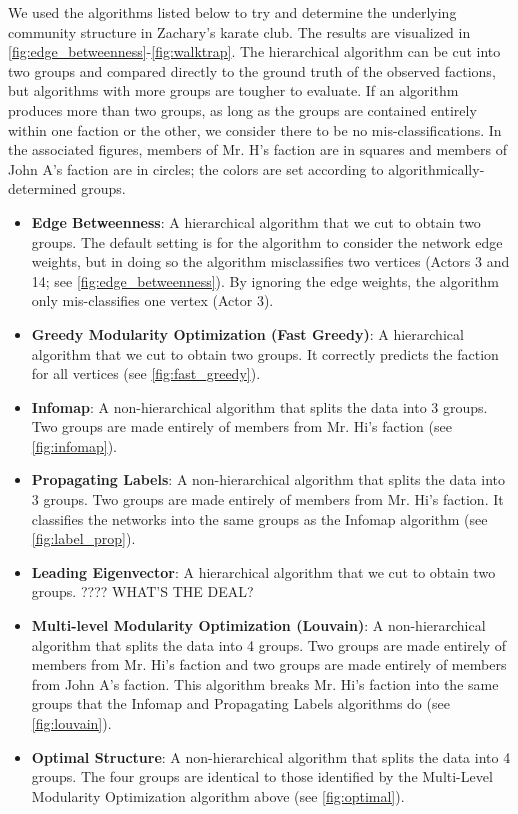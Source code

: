 We used the algorithms listed below to try and determine the underlying community structure in Zachary's karate club. The results are visualized in \cref{fig:edge_betweenness}-\cref{fig:walktrap}. The hierarchical algorithm can be cut into two groups and compared directly to the ground truth of the observed factions, but algorithms with more groups are tougher to evaluate. If an algorithm produces more than two groups, as long as the groups are contained entirely within one faction or the other, we consider there to be no mis-classifications. In the associated figures, members of Mr. H's faction are in squares and members of John A's faction are in circles; the colors are set according to algorithmically-determined groups.
\begin{itemize}
\item \textbf{Edge Betweenness}: A hierarchical algorithm that we cut to obtain two groups. The default setting is for the algorithm to consider the network edge weights, but in doing so the algorithm misclassifies two vertices (Actors 3 and 14; see \cref{fig:edge_betweenness}). By ignoring the edge weights, the algorithm only mis-classifies one vertex (Actor 3). 
\item \textbf{Greedy Modularity Optimization (Fast Greedy)}: A hierarchical algorithm that we cut to obtain two groups. It correctly predicts the faction for all vertices (see \cref{fig:fast_greedy}).
\item \textbf{Infomap}: A non-hierarchical algorithm that splits the data into 3 groups. Two groups are made entirely of members from Mr. Hi's faction (see \cref{fig:infomap}).
\item \textbf{Propagating Labels}: A non-hierarchical algorithm that splits the data into 3 groups. Two groups are made entirely of members from Mr. Hi's faction. It classifies the networks into the same groups as the Infomap algorithm (see \cref{fig:label_prop}).  
\item \textbf{Leading Eigenvector}: A hierarchical algorithm that we cut to obtain two groups. ???? WHAT'S THE DEAL?
\item \textbf{Multi-level Modularity Optimization (Louvain)}: A non-hierarchical algorithm that splits the data into 4 groups. Two groups are made entirely of members from Mr. Hi's faction and two groups are made entirely of members from John A's faction. This algorithm breaks Mr. Hi's faction into the same groups that the Infomap and Propagating Labels algorithms do (see \cref{fig:louvain}).
\item \textbf{Optimal Structure}: A non-hierarchical algorithm that splits the data into 4 groups. The four groups are identical to those identified by the Multi-Level Modularity Optimization algorithm above (see \cref{fig:optimal}).

\end{itemize}
